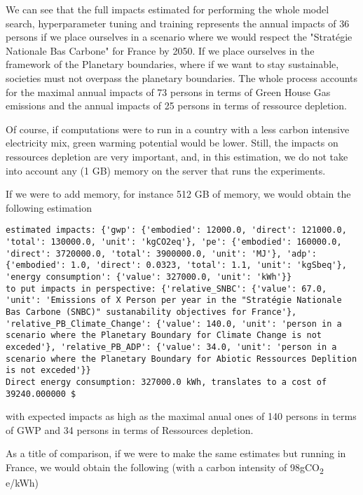 \documentclass[11pt]{article}
\begin{document}
We can see that the full impacts estimated for performing the whole
model search, hyperparameter tuning and training represents the annual
impacts of 36 persons if we place ourselves in a scenario where we
would respect the "Stratégie Nationale Bas Carbone" for France
by 2050. If we place ourselves in the framework of the Planetary
boundaries, where if we want to stay sustainable, societies must not
overpass the planetary boundaries. The whole process accounts for the
maximal annual impacts of 73 persons in terms of Green House Gas
emissions and the annual impacts of 25 persons in terms of ressource
depletion.

Of course, if computations were to run in a country with a
less carbon intensive electricity mix, green warming potential would
be lower. Still, the impacts on ressources depletion are very
important, and, in this estimation, we do not take into account any (1
GB) memory on the server that runs the experiments. 

If we were to add memory, for instance 512 GB of memory, we would
obtain the following estimation

\begin{verbatim}
estimated impacts: {'gwp': {'embodied': 12000.0, 'direct': 121000.0, 'total': 130000.0, 'unit': 'kgCO2eq'}, 'pe': {'embodied': 160000.0, 'direct': 3720000.0, 'total': 3900000.0, 'unit': 'MJ'}, 'adp': {'embodied': 1.0, 'direct': 0.0323, 'total': 1.1, 'unit': 'kgSbeq'}, 'energy consumption': {'value': 327000.0, 'unit': 'kWh'}}
to put impacts in perspective: {'relative_SNBC': {'value': 67.0, 'unit': 'Emissions of X Person per year in the "Stratégie Nationale Bas Carbone (SNBC)" sustanability objectives for France'}, 'relative_PB_Climate_Change': {'value': 140.0, 'unit': 'person in a scenario where the Planetary Boundary for Climate Change is not exceded'}, 'relative_PB_ADP': {'value': 34.0, 'unit': 'person in a scenario where the Planetary Boundary for Abiotic Ressources Deplition is not exceded'}}
Direct energy consumption: 327000.0 kWh, translates to a cost of 39240.000000 $
\end{verbatim}


with expected impacts as high as the maximal anual ones of 140 persons
in terms of GWP and 34 persons in terms of Ressources depletion.

As a title of comparison, if we were to make the same estimates but
running in France, we would obtain the following (with a carbon
intensity of 98gCO\textsubscript{2} e/kWh)
\end{document}
